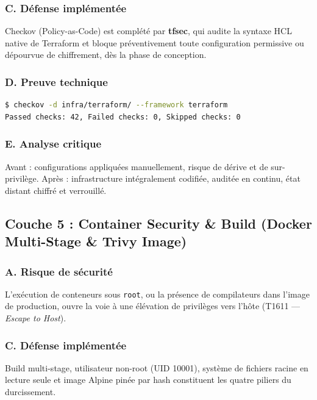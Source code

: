 \subsubsection{C. Défense implémentée}
Checkov (Policy-as-Code) est complété par \textbf{tfsec}, qui audite la syntaxe HCL native de Terraform et bloque préventivement toute configuration permissive ou dépourvue de chiffrement, dès la phase de conception.

\subsubsection{D. Preuve technique}
\begin{lstlisting}[language=bash, caption={Validation Checkov sur les modules Terraform}, label={lst:checkov_proof_layer}]
$ checkov -d infra/terraform/ --framework terraform
Passed checks: 42, Failed checks: 0, Skipped checks: 0
\end{lstlisting}

\subsubsection{E. Analyse critique}
Avant : configurations appliquées manuellement, risque de dérive et de sur-privilège. Après : infrastructure intégralement codifiée, auditée en continu, état distant chiffré et verrouillé.

\subsection{Couche 5 : Container Security \& Build (Docker Multi-Stage \& Trivy Image)}

\subsubsection{A. Risque de sécurité}
L'exécution de conteneurs sous \texttt{root}, ou la présence de compilateurs dans l'image de production, ouvre la voie à une élévation de privilèges vers l'hôte (T1611 — \textit{Escape to Host}).

\subsubsection{C. Défense implémentée}
Build multi-stage, utilisateur non-root (UID 10001), système de fichiers racine en lecture seule et image Alpine pinée par hash constituent les quatre piliers du durcissement.

